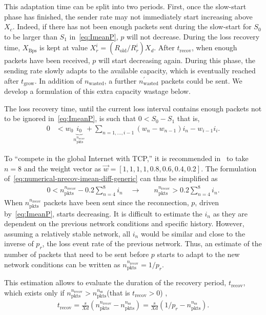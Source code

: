\documentclass[twocolumn]{nictatechreport}
\begin{document}
This adaptation time can be split into two periods.  First, once the
slow-start phase has finished, the sender rate may not immediately start
increasing above $X_c$. Indeed, if there has not been enough packets sent during
the slow-start for $S_0$ to be larger than $S_1$ in~\eqref{eq:ImeanP}, $p$
will not decrease. During the loss recovery time, $X_\mathrm{Bps}$ is kept at
value $X_r^i=(R_\mathrm{old}/R_r^i) X_d$. After $t_\mathrm{recov}$, when enough
packets have been received, $p$ will start decreasing again. During this phase,
the sending rate slowly adapts to the available capacity, which is eventually
reached after $t_\mathrm{grow}$. In addition of
$n_\mathrm{wasted}$, a further $n_\mathrm{wasted}^\prime$ packets could be sent.
We develop a formulation of this extra capacity wastage below.

The loss recovery time, until the current loss interval contains enough packets
not to be ignored in~\eqref{eq:ImeanP}, is such that $0 < S_0 - S_1$ that is,
\begin{align}
  0 &< w_0 \underbrace{i_0}_{n_\mathrm{pkts}^{n_\mathrm{recov}}} +
  \sum_{n=1,\ldots,i-1} (w_n - w_{n-1}) i_n - w_{i-1} i_i.
  \label{eq:numerical-nrecov-imean-diff-generic}
\end{align}

To ``compete in the global Internet with TCP,'' it is recommended
in~\cite{rfc5348} to take $n=8$ and the weight vector as $\vec w = [1, 1, 1, 1,
0.8, 0.6, 0.4, 0.2]$. The formulation
of~\eqref{eq:numerical-nrecov-imean-diff-generic} can thus be simplified as
\begin{align}
  0 < n_\mathrm{pkts}^{n_\mathrm{recov}} - 0.2 \sum_{n=4}^8i_n \quad\rightarrow\quad &
  n_\mathrm{pkts}^{n_\mathrm{recov}} > 0.2 \sum_{n=4}^8i_n.
  \label{eq:numerical-npktsrecov-rfc5348}
\end{align}
When $n_\mathrm{pkts}^{n_\mathrm{recov}}$ packets have been sent since the reconnection,
$p$, driven by~\eqref{eq:ImeanP}, starts decreasing. It is difficult to estimate the
$i_n$ as they are dependent on the previous network conditions and specific
history. However, assuming a relatively stable network, all $i_n$ would be
similar and close to the inverse of $p_r$, the loss event rate of the previous
network. Thus, an estimate of the number of packets that need to be sent before
$p$ starts to adapt to the new network conditions can be written as
$n_\mathrm{pkts}^{n_\mathrm{recov}} = 1/p_r$.

This estimation allows to evaluate the duration of the recovery period,
$t_\mathrm{recov}$, which exists only if
$n_\mathrm{pkts}^{n_\mathrm{recov}}>n_\mathrm{pkts}^{n_\mathrm{ss}}$(that is $t_\mathrm{recov}>0$) ,
\begin{gather}
t_\mathrm{recov} = \frac{s}{Xd}\left( n_\mathrm{pkts}^{n_\mathrm{recov}} - n_\mathrm{pkts}^{n_\mathrm{ss}} \right) = \frac{s}{Xd}\left( 1/p_r - n_\mathrm{pkts}^{n_\mathrm{ss}} \right).
  \label{eq:trecov}
\end{gather}
\end{document}
